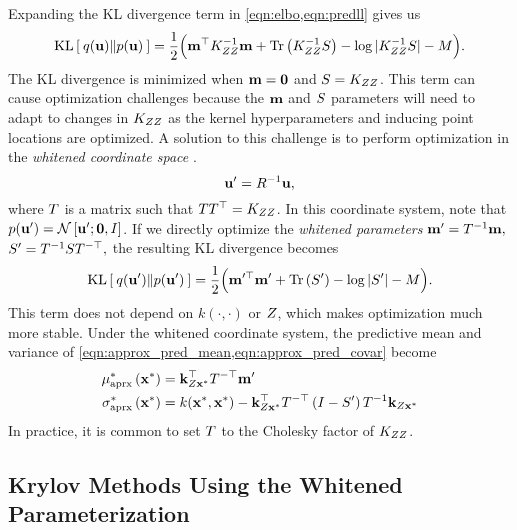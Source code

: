 Expanding the KL divergence term in \cref{eqn:elbo,eqn:predll} gives us
%
\begin{equation}
	\kl{ q(\bu) }{ p(\bu) } = \frac{1}{2} \Bigl( \bm^\top \bK_{\bZ\bZ}^{-1} \bm + \tr{ \bK_{\bZ\bZ}^{-1} \bS } - \log \vert \bK_{\bZ\bZ}^{-1} \bS \vert - M \Bigr).
	\label{eqn:kldiv}
\end{equation}
%
The KL divergence is minimized when $\mathbf{m} = \mathbf{0}$ and $S = K_{ZZ}$.
This term can cause optimization challenges because the $\mathbf{m}$ and $S$ parameters will need to adapt to changes in $K_{ZZ}$ as the kernel hyperparameters and inducing point locations are optimized.
A solution to this challenge is to perform optimization in the \emph{whitened coordinate space} \cite{matthews2017scalable}.
\[ \mathbf{u}' = R^{-1} \mathbf{u}, \]
where $T$ is a matrix such that $T T^\top = K_{ZZ}$.
In this coordinate system, note that $p(\mathbf{u}') = \mathcal{N} \left[  \mathbf{u}'; \mathbf{0}, I \right]$.
If we directly optimize the \emph{whitened parameters} $\mathbf{m}' = T^{-1} \mathbf{m},$ $S' = T^{-1} S T^{-\top},$
the resulting KL divergence becomes
%
\begin{equation}
	\kl{ q(\bu') }{ p(\bu') } = \frac{1}{2} \Bigl( \bm^{\prime \top} \bm' + \tr{ \bS' } - \log \vert \bS' \vert - M \Bigr).
	\label{eqn:kldiv_whitened}
\end{equation}
%
This term does not depend on $k(\cdot,\cdot)$ or $Z$, which makes optimization much more stable.
Under the whitened coordinate system, the predictive mean and variance of \cref{eqn:approx_pred_mean,eqn:approx_pred_covar} become
%
\begin{align}
  \mu^*_\text{aprx} \left( \mathbf{x}^* \right) &= \mathbf{k}_{Z\mathbf{x}^*}^\top T^{-\top} \mathbf{m}'
  \label{eqn:approx_pred_mean} \\
  \sigma^*_\text{aprx} \left( \mathbf{x}^* \right) &= k(\mathbf{x}^*, \mathbf{x}^*) -
    \mathbf{k}_{Z\mathbf{x}^*}^\top T^{-\top} \left( I - S' \right) T^{-1} \mathbf{k}_{Z\mathbf{x}^*}
  \label{eqn:approx_pred_covar}
\end{align}
%
In practice, it is common to set $T$ to the Cholesky factor of $K_{ZZ}$.


\subsection{Krylov Methods Using the Whitened Parameterization}
